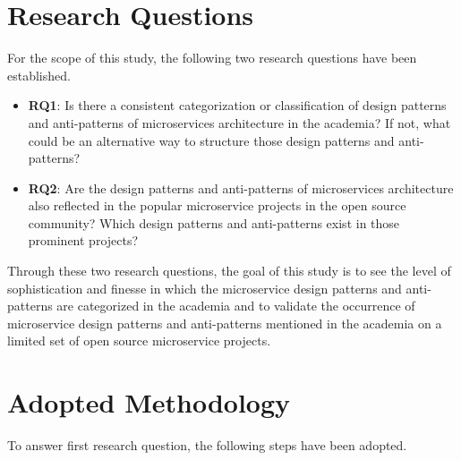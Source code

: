 \documentclass{Configuration_Files/PoliMi3i_thesis}
\begin{document}
\section{Research Questions}
\label{sec:research_questions}

For the scope of this study, the following two research questions have been established.

\begin{itemize}
    \item \textbf{RQ1}: Is there a consistent categorization or classification of design patterns and anti-patterns of microservices architecture in the academia?
    If not, what could be an alternative way to structure those design patterns and anti-patterns?
    
    \item \textbf{RQ2}: Are the design patterns and anti-patterns of microservices architecture also reflected in the popular microservice projects in the open source community?
    Which design patterns and anti-patterns exist in those prominent projects?
\end{itemize}

Through these two research questions, the goal of this study is to see the level of sophistication and finesse in which the microservice design patterns and anti-patterns are categorized in the academia and to validate the occurrence of microservice design patterns and anti-patterns mentioned in the academia on a limited set of open source microservice projects.

\section{Adopted Methodology}
\label{sec:adopted_method}

To answer first research question, the following steps have been adopted.
\end{document}
